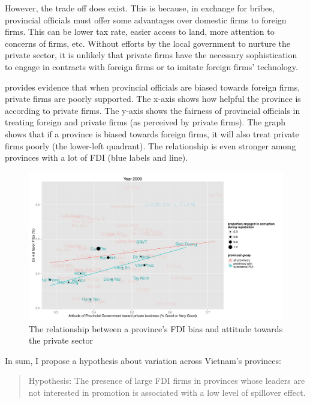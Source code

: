 \begin{enumerate}
However, the trade off does exist. This is because, in exchange for bribes, provincial officials must offer some advantages over domestic firms to foreign firms. This can be lower tax rate, easier access to land, more attention to concerns of firms, etc. Without efforts by the local government to nurture the private sector, it is unlikely that private firms have the necessary sophistication to engage in contracts with foreign firms or to imitate foreign firms' technology.

 provides evidence that when provincial officials are biased towards foreign firms, private firms are poorly supported. The x-axis shows how helpful the province is according to private firms. The y-axis shows the fairness of provincial officials in treating foreign and private firms (as perceived by private firms). The graph shows that if a province is biased towards foreign firms, it will also treat private firms poorly (the lower-left quadrant). The relationship is even stronger among provinces with a lot of FDI (blue labels and line).
\end{enumerate}

\begin{figure}[!ht]
\includegraphics[width=\textwidth,keepaspectratio]{../figure/FDI_bias}
\caption{The relationship between a province's FDI bias and attitude towards the private sector}
\label{fig:fdi_bias_vietnam}
\end{figure}

In sum, I propose a hypothesis about variation across Vietnam's provinces:

\begin{quote}
Hypothesis: The presence of large FDI firms in provinces whose leaders are not interested in promotion is associated with a low level of spillover effect.
\end{quote}
